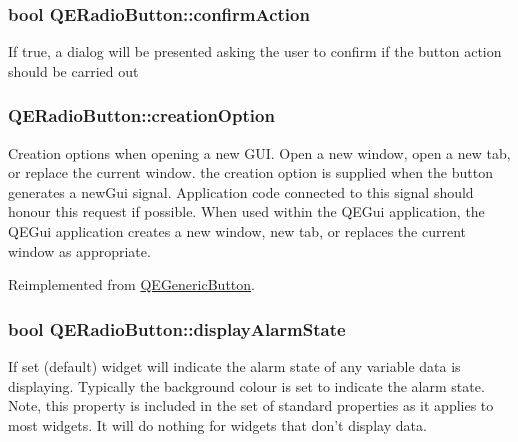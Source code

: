 \hypertarget{classQERadioButton_ab44cfab36427aff037f31420a7121fd7}{
\subsubsection[{confirmAction}]{\setlength{\rightskip}{0pt plus 5cm}bool QERadioButton::confirmAction}}
\label{classQERadioButton_ab44cfab36427aff037f31420a7121fd7}
If true, a dialog will be presented asking the user to confirm if the button action should be carried out \hypertarget{classQERadioButton_a3bbdb5f0fa63690f2e97491e8bfab454}{
\subsubsection[{creationOption}]{ QERadioButton::creationOption}}
\label{classQERadioButton_a3bbdb5f0fa63690f2e97491e8bfab454}
Creation options when opening a new GUI. Open a new window, open a new tab, or replace the current window. the creation option is supplied when the button generates a newGui signal. Application code connected to this signal should honour this request if possible. When used within the QEGui application, the QEGui application creates a new window, new tab, or replaces the current window as appropriate. 

Reimplemented from \hyperlink{classQEGenericButton}{QEGenericButton}.

\hypertarget{classQERadioButton_a91a1d0241459be2381e8402a816c01a8}{
\subsubsection[{displayAlarmState}]{\setlength{\rightskip}{0pt plus 5cm}bool QERadioButton::displayAlarmState}}
\label{classQERadioButton_a91a1d0241459be2381e8402a816c01a8}
If set (default) widget will indicate the alarm state of any variable data is displaying. Typically the background colour is set to indicate the alarm state. Note, this property is included in the set of standard properties as it applies to most widgets. It will do nothing for widgets that don't display data. 

